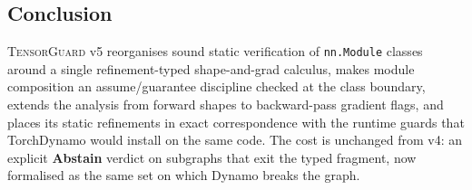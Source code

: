 \subsection{Conclusion}\label{sec:conclusion}

\textsc{TensorGuard} v5 reorganises sound static verification of
\verb|nn.Module| classes around a single refinement-typed
shape-and-grad calculus, makes module composition an
assume/guarantee discipline checked at the class boundary,
extends the analysis from forward shapes to backward-pass
gradient flags, and places its static refinements in exact
correspondence with the runtime guards that TorchDynamo would
install on the same code. The cost is unchanged from v4: an
explicit \textbf{Abstain} verdict on subgraphs that exit the typed
fragment, now formalised as the same set on which Dynamo breaks
the graph.
